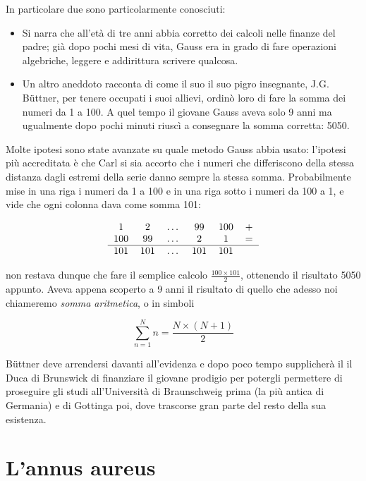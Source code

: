 In particolare due sono particolarmente conosciuti:
\begin{itemize}
	\item Si narra che all'età di tre anni abbia corretto dei calcoli nelle finanze del padre; già dopo pochi mesi di vita, Gauss era in grado di fare operazioni algebriche, leggere e addirittura scrivere qualcosa.
	\item Un altro aneddoto racconta di come il suo il suo pigro insegnante, J.G. B\"{u}ttner, per tenere occupati i suoi allievi, ordinò loro di fare la somma dei numeri da 1 a 100. A quel tempo il giovane Gauss aveva solo 9 anni ma ugualmente dopo pochi minuti riuscì a consegnare la somma corretta: 5050.
\end{itemize}
Molte ipotesi sono state avanzate su quale metodo Gauss abbia usato: l'ipotesi più accreditata è che Carl si sia accorto che i numeri che differiscono della stessa distanza dagli estremi della serie danno sempre la stessa somma. Probabilmente mise in una riga i numeri da 1 a 100 e in una riga sotto i numeri da 100 a 1, e vide che ogni colonna dava come somma 101:

\[\begin{tabular}{cccccc}
$1$  &  $2$  &  $\dots $ & $99$  &  $100$ & $ + $\\
$100$  &  $99$  &  $\dots $ & $2$  &  $1$ & $ = $ \\ \hline
$101$  &  $101$  &  $\dots $ & $101$  &  $101$ & $  $\\
\end{tabular}\]

non restava dunque che fare il semplice calcolo $ \frac{100 \times 101}{2} $, ottenendo il risultato 5050 appunto. Aveva appena scoperto a 9 anni il risultato di quello che adesso noi chiameremo \emph{somma aritmetica}, o in simboli

\[\sum_{n=1}^{N} n  = \frac{N\times(N+1)}{2}  \] 

B\"uttner deve arrendersi davanti all'evidenza e dopo poco tempo supplicherà il il Duca di Brunswick di finanziare il giovane prodigio per potergli permettere di proseguire gli studi all'Università di Braunschweig prima (la più antica di Germania) e di Gottinga poi, dove trascorse gran parte del resto della sua esistenza.

\section{L'annus aureus}


